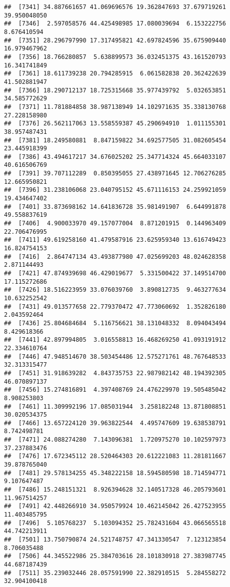 \documentclass[
]{article}
\begin{document}
\begin{verbatim}
##  [7341] 34.887661657 41.069696576 19.362847693 37.679719261 39.950048050
##  [7346]  2.597058576 44.425498985 17.080039694  6.153222756  8.676410594
##  [7351] 28.296797990 17.317495821 42.697824596 35.675909440 16.979467962
##  [7356] 18.766280857  5.638899573 36.032451375 43.161520793 16.341741849
##  [7361] 18.611739238 20.794285915  6.061582838 20.362422639 41.502881947
##  [7366] 18.290712137 18.725315668 35.977439792  5.032653851 34.585772629
##  [7371] 11.781884858 38.987138949 14.102971635 35.338130768 27.228158980
##  [7376] 26.562117063 13.558559387 45.290694910  1.011155301 38.957487431
##  [7381] 18.249580881  8.847159822 34.692577505 31.082605454 23.445918399
##  [7386] 43.494617217 34.676025202 25.347714324 45.664033107 40.616506769
##  [7391] 39.707112289  0.850395055 27.438971645 12.706276285 12.665950821
##  [7396] 31.238106068 23.040795152 45.671116153 24.259921059 19.434647402
##  [7401] 33.873698162 14.641836728 35.981491907  6.644991878 49.558837619
##  [7406]  4.900033970 49.157077004  8.871201915  0.144963409 22.706476995
##  [7411] 49.619258160 41.479587916 23.625959340 13.616749423 16.824754153
##  [7416]  2.864747134 43.493877980 47.025699203 48.024628358  2.871144493
##  [7421] 47.874939698 46.429019677  5.331500422 37.149514700 17.115272686
##  [7426] 18.516223959 33.076039760  3.890812735  9.463277634 10.632252542
##  [7431] 49.013577658 22.779370472 47.773060692  1.352826180  2.043592464
##  [7436] 25.804684684  5.116756621 38.131048332  8.094043494  8.429618366
##  [7441] 42.897994805  3.016558813 16.468269250 41.093191912 22.334610764
##  [7446] 47.948514670 38.503454486 12.575271761 48.767648533 32.313315477
##  [7451] 31.918639282  4.843735753 22.987982142 48.194392305 46.070897137
##  [7456] 15.274816891  4.397408769 24.476229970 19.505485042  8.908253803
##  [7461] 11.309992196 17.085031944  3.258182248 13.871808851 30.020534375
##  [7466] 13.657224120 39.963822544  4.495747609 19.638538791  8.742498781
##  [7471] 24.088274280  7.143096381  1.720975270 10.102597973 37.237883476
##  [7476] 17.672345112 28.520464303 20.612221083 11.281811667 39.878765040
##  [7481] 29.578134255 45.348222158 18.594580598 18.714594771  9.107647487
##  [7486] 15.248151321  8.926394628 32.140517328 46.205793601 11.967514257
##  [7491] 42.448266910 34.950579924 10.462145042 26.427523955 11.403485795
##  [7496]  5.105768237  5.103094352 25.782431604 43.066565518 44.742213911
##  [7501] 13.750790874 24.521748757 47.341330547  7.123123854  8.706035488
##  [7506] 44.345522986 25.384703616 28.101830918 27.383987745 44.687187439
##  [7511] 35.239032446 28.057591990 22.382910515  5.284558272 32.904100418

\end{verbatim}
\end{document}
